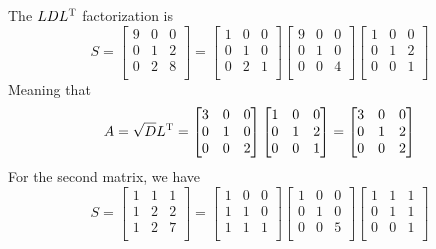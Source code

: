 \documentclass[a4paper]{article}
\begin{document}
The \(LDL^{\textsc{T}}\) factorization is
\[
	S = 
	\begin{bmatrix}
		9 & 0 & 0 \\
		0 & 1 & 2 \\
		0 & 2 & 8 \\
	\end{bmatrix}
	=
	\begin{bmatrix}
		1 & 0 & 0 \\
		0 & 1 & 0 \\
		0 & 2 & 1 \\
	\end{bmatrix}
	\begin{bmatrix}
		9 & 0 & 0 \\
		0 & 1 & 0 \\
		0 & 0 & 4 \\
	\end{bmatrix}
	\begin{bmatrix}
		1 & 0 & 0 \\
		0 & 1 & 2 \\
		0 & 0 & 1 \\
	\end{bmatrix}
\]
Meaning that
\[
	A = \sqrt{D}L^{\textsc{T}} =
	\begin{bmatrix}
		3 & 0 & 0 \\
		0 & 1 & 0 \\
		0 & 0 & 2 \\
	\end{bmatrix}
	\begin{bmatrix}
		1 & 0 & 0 \\
		0 & 1 & 2 \\
		0 & 0 & 1 \\
	\end{bmatrix}
	=
	\begin{bmatrix}
		3 & 0 & 0 \\
		0 & 1 & 2 \\
		0 & 0 & 2 \\
	\end{bmatrix}
\]
For the second matrix, we have
\[
	S = 
	\begin{bmatrix}
		1 & 1 & 1 \\
		1 & 2 & 2 \\
		1 & 2 & 7 \\
	\end{bmatrix}
	=
	\begin{bmatrix}
		1 & 0 & 0 \\
		1 & 1 & 0 \\
		1 & 1 & 1 \\
	\end{bmatrix}
	\begin{bmatrix}
		1 & 0 & 0 \\
		0 & 1 & 0 \\
		0 & 0 & 5 \\
	\end{bmatrix}
	\begin{bmatrix}
		1 & 1 & 1 \\
		0 & 1 & 1 \\
		0 & 0 & 1 \\
	\end{bmatrix}
\]
\end{document}
